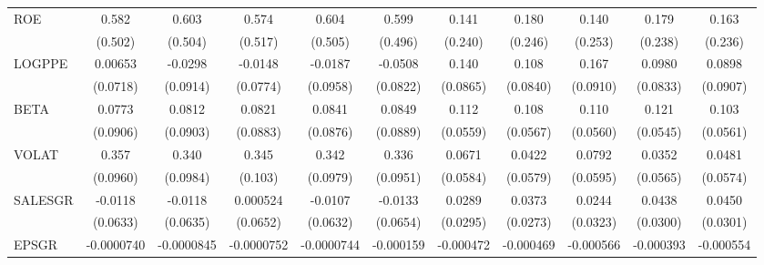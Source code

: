 \begin{table}[htbp]
\begin{tabular}{l*{10}{c}}
ROE             &    0.582         &    0.603         &    0.574         &    0.604         &    0.599         &    0.141         &    0.180         &    0.140         &    0.179         &    0.163         \\
                &  (0.502)         &  (0.504)         &  (0.517)         &  (0.505)         &  (0.496)         &  (0.240)         &  (0.246)         &  (0.253)         &  (0.238)         &  (0.236)         \\
LOGPPE          &  0.00653         &  -0.0298         &  -0.0148         &  -0.0187         &  -0.0508         &    0.140         &    0.108         &    0.167\sym{*}  &   0.0980         &   0.0898         \\
                & (0.0718)         & (0.0914)         & (0.0774)         & (0.0958)         & (0.0822)         & (0.0865)         & (0.0840)         & (0.0910)         & (0.0833)         & (0.0907)         \\
BETA            &   0.0773         &   0.0812         &   0.0821         &   0.0841         &   0.0849         &    0.112\sym{*}  &    0.108\sym{*}  &    0.110\sym{*}  &    0.121\sym{**} &    0.103\sym{*}  \\
                & (0.0906)         & (0.0903)         & (0.0883)         & (0.0876)         & (0.0889)         & (0.0559)         & (0.0567)         & (0.0560)         & (0.0545)         & (0.0561)         \\
VOLAT           &    0.357\sym{***}&    0.340\sym{***}&    0.345\sym{***}&    0.342\sym{***}&    0.336\sym{***}&   0.0671         &   0.0422         &   0.0792         &   0.0352         &   0.0481         \\
                & (0.0960)         & (0.0984)         &  (0.103)         & (0.0979)         & (0.0951)         & (0.0584)         & (0.0579)         & (0.0595)         & (0.0565)         & (0.0574)         \\
SALESGR         &  -0.0118         &  -0.0118         & 0.000524         &  -0.0107         &  -0.0133         &   0.0289         &   0.0373         &   0.0244         &   0.0438         &   0.0450         \\
                & (0.0633)         & (0.0635)         & (0.0652)         & (0.0632)         & (0.0654)         & (0.0295)         & (0.0273)         & (0.0323)         & (0.0300)         & (0.0301)         \\
EPSGR           &-0.0000740         &-0.0000845         &-0.0000752         &-0.0000744         &-0.000159         &-0.000472         &-0.000469         &-0.000566         &-0.000393         &-0.000554         \\

\end{tabular}
\end{table}
